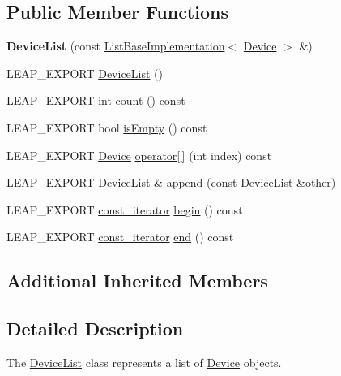 \subsection*{Public Member Functions}
\begin{DoxyCompactItemize}
\item 
\hypertarget{class_leap_1_1_device_list_a5526b7741f4a2689c330d34fc7a865db}{{\bfseries Device\+List} (const \hyperlink{class_leap_1_1_list_base_implementation}{List\+Base\+Implementation}$<$ \hyperlink{class_leap_1_1_device}{Device} $>$ \&)}\label{class_leap_1_1_device_list_a5526b7741f4a2689c330d34fc7a865db}

\item 
L\+E\+A\+P\+\_\+\+E\+X\+P\+O\+R\+T \hyperlink{class_leap_1_1_device_list_a6b438e4f4e9486c9d38e6ac01a9e7b93}{Device\+List} ()
\item 
L\+E\+A\+P\+\_\+\+E\+X\+P\+O\+R\+T int \hyperlink{class_leap_1_1_device_list_ad908f85b9d6282f4a898b743c4be3572}{count} () const 
\item 
L\+E\+A\+P\+\_\+\+E\+X\+P\+O\+R\+T bool \hyperlink{class_leap_1_1_device_list_abe9d868daf53da6fa412e19d64330684}{is\+Empty} () const 
\item 
L\+E\+A\+P\+\_\+\+E\+X\+P\+O\+R\+T \hyperlink{class_leap_1_1_device}{Device} \hyperlink{class_leap_1_1_device_list_a6719e35225afb3ddc9a1f303b273d831}{operator\mbox{[}$\,$\mbox{]}} (int index) const 
\item 
L\+E\+A\+P\+\_\+\+E\+X\+P\+O\+R\+T \hyperlink{class_leap_1_1_device_list}{Device\+List} \& \hyperlink{class_leap_1_1_device_list_aa5a6dd4fcc38029bfd381e34bcae4c43}{append} (const \hyperlink{class_leap_1_1_device_list}{Device\+List} \&other)
\item 
L\+E\+A\+P\+\_\+\+E\+X\+P\+O\+R\+T \hyperlink{class_leap_1_1_device_list_acfe5b07cda502759bf8fe768e8c6ba87}{const\+\_\+iterator} \hyperlink{class_leap_1_1_device_list_aa8743e646b1ba2ad7384153d67b01668}{begin} () const 
\item 
L\+E\+A\+P\+\_\+\+E\+X\+P\+O\+R\+T \hyperlink{class_leap_1_1_device_list_acfe5b07cda502759bf8fe768e8c6ba87}{const\+\_\+iterator} \hyperlink{class_leap_1_1_device_list_a6cf5deb1156da1b3af00c902ee170d67}{end} () const 
\end{DoxyCompactItemize}
\subsection*{Additional Inherited Members}


\subsection{Detailed Description}
The \hyperlink{class_leap_1_1_device_list}{Device\+List} class represents a list of \hyperlink{class_leap_1_1_device}{Device} objects.

